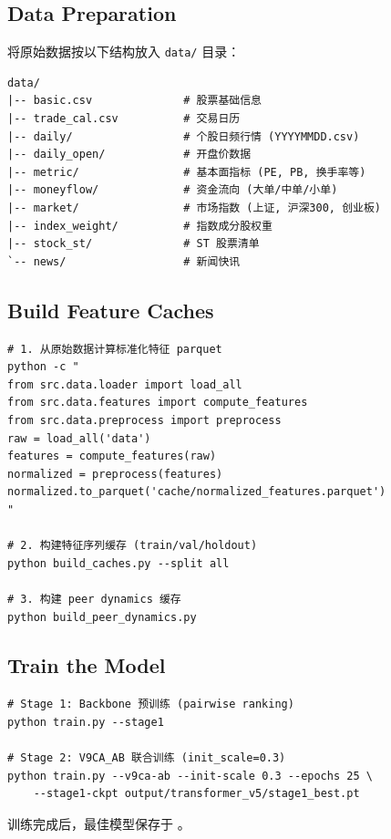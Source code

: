 \subsection*{Data Preparation}

将原始数据按以下结构放入 \texttt{data/} 目录：

\begin{verbatim}
data/
|-- basic.csv              # 股票基础信息
|-- trade_cal.csv          # 交易日历
|-- daily/                 # 个股日频行情 (YYYYMMDD.csv)
|-- daily_open/            # 开盘价数据
|-- metric/                # 基本面指标 (PE, PB, 换手率等)
|-- moneyflow/             # 资金流向 (大单/中单/小单)
|-- market/                # 市场指数 (上证, 沪深300, 创业板)
|-- index_weight/          # 指数成分股权重
|-- stock_st/              # ST 股票清单
`-- news/                  # 新闻快讯
\end{verbatim}

\subsection*{Build Feature Caches}

\begin{verbatim}
# 1. 从原始数据计算标准化特征 parquet
python -c "
from src.data.loader import load_all
from src.data.features import compute_features
from src.data.preprocess import preprocess
raw = load_all('data')
features = compute_features(raw)
normalized = preprocess(features)
normalized.to_parquet('cache/normalized_features.parquet')
"

# 2. 构建特征序列缓存 (train/val/holdout)
python build_caches.py --split all

# 3. 构建 peer dynamics 缓存
python build_peer_dynamics.py
\end{verbatim}

\subsection*{Train the Model}

\begin{verbatim}
# Stage 1: Backbone 预训练 (pairwise ranking)
python train.py --stage1

# Stage 2: V9CA_AB 联合训练 (init_scale=0.3)
python train.py --v9ca-ab --init-scale 0.3 --epochs 25 \
    --stage1-ckpt output/transformer_v5/stage1_best.pt
\end{verbatim}

训练完成后，最佳模型保存于
。

